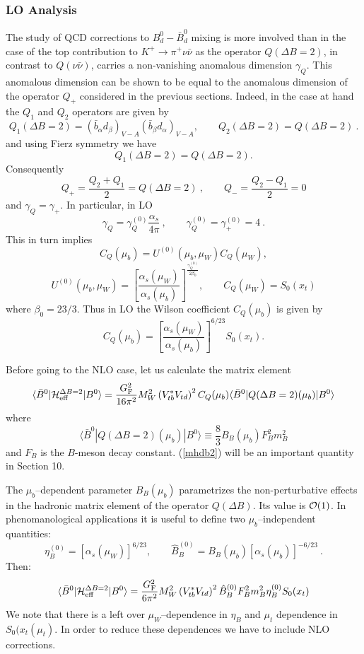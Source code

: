\documentclass[12pt,rotate]{article}
\def\as{\alpha_s}
\newcommand{\be}{\begin{equation}}
\newcommand{\ee}{\end{equation}}
\newcommand{\ord}{{\cal O}}
\newcommand{\f}{\frac}
\begin{document}
\begin{itemize}
\begin{itemize}
\subsubsection{LO Analysis}
The study of QCD corrections to 
$B^0_d-\bar B^0_d$ mixing  is more involved 
than in the case of the top contribution to $K^+\to\pi^+\nu\bar\nu$
as
the operator $Q(\Delta B=2)$, in contrast to $Q(\nu\bar\nu)$, carries
a non-vanishing anomalous dimension $\gamma_Q$. This anomalous dimension
can be shown to be equal to the anomalous dimension of the operator
$Q_+$ considered in the previous sections. Indeed, in the case at hand
the $Q_1$ and $Q_2$ operators are given by
\be
Q_1(\Delta B=2)=(\bar b_\alpha d_\beta)_{V-A}(\bar b_\beta d_\alpha)_{V-A},
\quad\quad
Q_2(\Delta B=2)=Q(\Delta B=2)~.
\ee
and using Fierz symmetry we have
\be
Q_1(\Delta B=2)=Q(\Delta B=2).
\ee
Consequently
\be
Q_+=\frac{Q_2+Q_1}{2}=Q(\Delta B=2)~,
\qquad
Q_-=\frac{Q_2-Q_1}{2}=0  
\ee 
and $\gamma_Q=\gamma_+$. In particular, in LO
\begin{equation}\label{gamq0}
\gamma_Q=\gamma_Q^{(0)}\frac{\as}{4\pi}~,
\qquad
\gamma_Q^{(0)}=
\gamma_+^{(0)}=4~.
\end{equation}
This in turn implies
\be
C_Q(\mu_b)=U^{(0)}(\mu_b,\mu_W) C_Q(\mu_W),
\ee
\be
U^{(0)}(\mu_b,\mu_W)=
\left[\f{\as(\mu_W)}{\as(\mu_b)}\right]^{\f{\gamma_Q^{(0)}}{2\beta_0}},
\qquad
C_Q(\mu_W)=S_0(x_t)
\ee
where $\beta_0=23/3$.
Thus in LO the Wilson coefficient $C_Q(\mu_b)$ is given by
\be
C_Q(\mu_b)=\left[\f{\as(\mu_W)}{\as(\mu_b)}\right]^{6/23} S_0(x_t).
\ee

Before going to the NLO case, let us calculate the matrix element
\begin{equation}\label{mhdb2}
\langle \bar B^0|{\cal H}^{\Delta B=2}_{\rm eff}|B^0\rangle
=\frac{G^2_{\rm F}}{16\pi^2}M^2_W
 \left(V^\ast_{tb}V_{td}\right)^2 
 C_Q(\mu_b) \langle \bar B^0|Q(\Delta B=2)(\mu_b) |B^0\rangle
\end{equation}
where
\begin{equation}
\langle \bar B^0|Q(\Delta B=2)(\mu_b)|B^0\rangle
\equiv \frac{8}{3} B_{B}(\mu_b) F_{B}^2 m_{B}^2
\label{eq:BbarB0}
\end{equation}
and $F_{B}$ is the $B$-meson decay constant. (\ref{mhdb2}) will be an 
important quantity in Section 10.

The $\mu_b$--dependent parameter $B_B(\mu_b)$ parametrizes 
the non-perturbative effects in the hadronic matrix element of the
operator $Q(\Delta B)$. Its value is $\ord(1)$. In phenomanological
applications it is useful to define two
$\mu_b$--independent quantities:
\be
\eta^{(0)}_B=\left[\as(\mu_W)\right]^{6/23},
\qquad
\hat B^{(0)}_{B} = B_{B}(\mu_b) \left[ \as(\mu_b) \right]^{-6/23}~.
\ee
Then:
\begin{equation}\label{mhdb3}
\langle \bar B^0|{\cal H}^{\Delta B=2}_{\rm eff}|B^0\rangle
=\frac{G^2_{\rm F}}{6\pi^2}M^2_W
 \left(V^\ast_{tb}V_{td}\right)^2 
 \hat B^{(0)}_B F^2_B m_B^2\eta^{(0)}_B S_0(x_t)
\end{equation}
We note that there is a left over $\mu_W$--dependence in $\eta_B$ and
$\mu_t$ dependence in $S_0(x_t(\mu_t)$. In order to reduce these dependences
we have to include NLO corrections.


\end{itemize}
\end{itemize}
\end{document}
